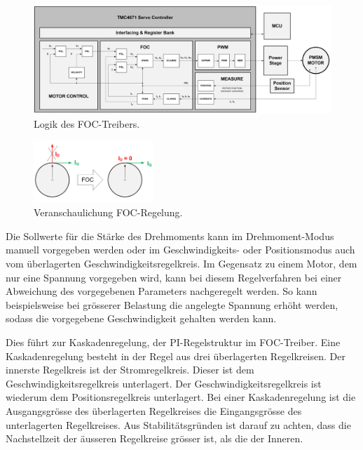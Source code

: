 \begin{figure}[H]
	\centering
	\includegraphics[width=\textwidth]{graphics/FOC}
	\caption{Logik des FOC-Treibers. \cite[S.14]{trinamicmotion_control_gmbh__co_kg_tmc6200_2019}}
	\label{fig:FOC}
\end{figure}

\begin{figure}[H]
	\centering
	\includegraphics[width=0.4\textwidth]{graphics/FOC_2}
	\caption{Veranschaulichung FOC-Regelung. \cite[S.9]{trinamicmotion_control_gmbh__co_kg_tmc6200_2019}}
	\label{fig:FOC_2}
\end{figure}

Die Sollwerte für die Stärke des Drehmoments kann im Drehmoment-Modus manuell vorgegeben werden oder im Geschwindigkeits- oder Positionsmodus auch vom überlagerten Geschwindigkeitsregelkreis. Im Gegensatz zu einem Motor, dem nur eine Spannung vorgegeben wird, kann bei diesem Regelverfahren bei einer Abweichung des vorgegebenen Parameters nachgeregelt werden. So kann beispielsweise bei grösserer Belastung die angelegte Spannung erhöht werden, sodass die vorgegebene Geschwindigkeit gehalten werden kann.

Dies führt zur Kaskadenregelung, der PI-Regelstruktur im FOC-Treiber. Eine Kaskadenregelung besteht in der Regel aus drei überlagerten Regelkreisen. Der innerste Regelkreis ist der Stromregelkreis. Dieser ist dem Geschwindigkeitsregelkreis unterlagert. Der Geschwindigkeitsregelkreis ist wiederum dem Positionsregelkreis unterlagert. Bei einer Kaskadenregelung ist die Ausgangsgrösse des überlagerten Regelkreises die Eingangsgrösse des unterlagerten Regelkreises. Aus Stabilitätsgründen ist darauf zu achten, dass die Nachstellzeit der äusseren Regelkreise grösser ist, als die der Inneren.

